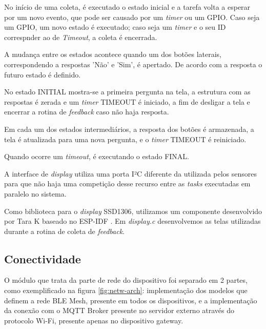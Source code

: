 \documentclass[../monografia.tex]{subfiles}
\begin{document}
No início de uma coleta, é executado o estado inicial e a tarefa volta a esperar por um novo evento, que pode ser causado por um \textit{timer} ou um GPIO. Caso seja um GPIO, um novo estado é executado; caso seja um \textit{timer} e o seu ID correspnder ao de \textit{Timeout}, a coleta é encerrada.

A mudança entre os estados acontece quando um dos botões laterais, correspondendo a respostas 'Não' e 'Sim', é apertado. De acordo com a resposta o futuro estado é definido. 

No estado INITIAL mostra-se a primeira pergunta na tela, a estrutura com as respostas é zerada e um \textit{timer} TIMEOUT é iniciado, a fim de desligar a tela e encerrar a rotina de \textit{feedback} caso não haja resposta. 

Em cada um dos estados intermediários, a resposta dos botões é armazenada, a tela é atualizada para uma nova pergunta, e o \textit{timer} TIMEOUT é reiniciado. 

Quando ocorre um \textit{timeout}, é executando o estado FINAL. 

A interface de \textit{display} utiliza uma porta I²C diferente da utilizada pelos sensores para que não haja uma competição desse recurso entre as \textit{tasks} executadas em paralelo no sistema.

Como biblioteca para o \textit{display} SSD1306, utilizamos um componente desenvolvido por Tara K \cite{TaraK} baseado no ESP-IDF \cite{SSD1306}. Em \textit{display.c} desenvolvemos as telas utilizadas durante a rotina de coleta de \textit{feedback}. 


\subsection{Conectividade}

O módulo que trata da parte de rede do dispositivo foi separado em 2 partes, como exemplificado na figura \ref{fig:netw-arch}: implementação dos modelos que definem a rede BLE Mesh, presente em todos os dispositivos, e a implementação da conexão com o MQTT Broker presente no servidor externo através do protocolo Wi-Fi, presente apenas no dispositivo gateway.
\end{document}
